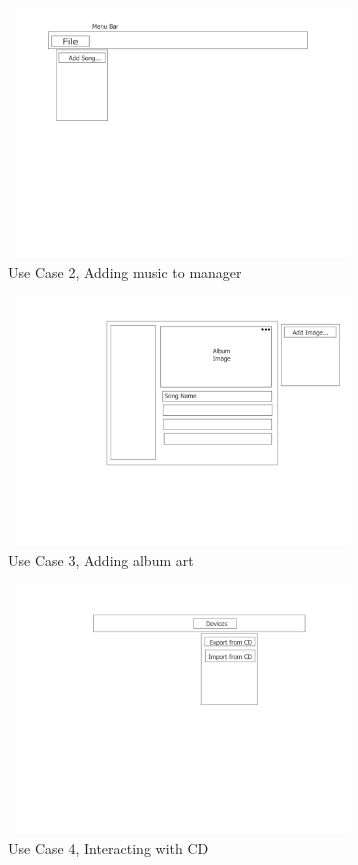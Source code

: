 \documentclass[10pt,conference,onecolumn,compsoc]{IEEEtran}
\begin{document}
\begin{figure}[ht!]
\includegraphics[height=250px, width=350px]{Add_Music_Mock_Up.jpg}
\caption{Use Case 2, Adding music to manager}
\label{AddMusic}
\end{figure}

\begin{figure}
\includegraphics[height=250px, width=350px]{Add_Image_Mock_Up.jpg}
\caption{Use Case 3, Adding album art}
\label{AddAlbumArt}
\end{figure}

\begin{figure}
\includegraphics[height=250px, width=350px]{Play_CD_Mock_Up.jpg}
\caption{Use Case 4, Interacting with CD}
\label{PlayCD}
\end{figure}
\end{document}
